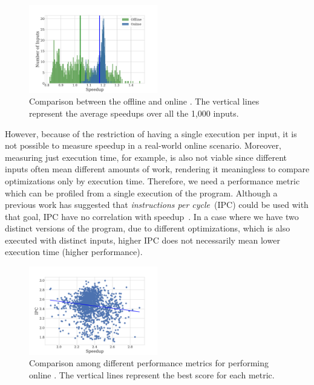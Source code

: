 \begin{figure}[t!]
    \centering
    \includegraphics[width=0.5\textwidth]{figs/motivation-online.pdf}
    \caption{Comparison between the offline and online {\itercomp}.
             The vertical lines represent the average speedups over
             all the 1,000 inputs.}
    \label{fig:motivation-online}
\end{figure}


However, because of the restriction of having a single execution per input,
it is not possible to measure speedup in a real-world online scenario.
Moreover, measuring just execution time, for example, is also not viable since
different inputs often mean different amounts of work,
rendering it meaningless to compare optimizations only by execution time.
Therefore, we need a performance metric which can be profiled from a single
execution of the program.
Although a previous work has suggested that \textit{instructions per cycle}~(IPC)
could be used with that goal, IPC have no correlation with speedup~\citep{fursin07}.
In a case where we have two distinct versions of the program, due to different
optimizations, which is also executed with distinct inputs, higher IPC does not
necessarily mean lower execution time (higher performance).

\begin{figure}[t]
    \centering
    \includegraphics[width=0.5\textwidth]{figs/motivation-metric.pdf}
    \caption{Comparison among different performance metrics for performing
             online {\itercomp}.
             The vertical lines represent the best score for each metric.}
    \label{fig:motivation-metric}
\end{figure}

